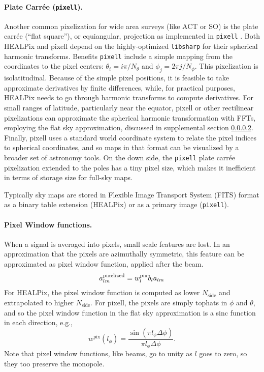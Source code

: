 \paragraph{Plate Carr\'ee (\texttt{pixell}).}
Another common pixelization for wide area surveys (like ACT or SO) is the plate carr\'ee (``flat square''), or equiangular, projection as implemented in \texttt{pixell} \citep{2021ascl.soft02003N}.  Both HEALPix and pixell depend on the highly-optimized \texttt{libsharp} \citep{2013A&A...554A.112R} for their spherical harmonic transforms.  Benefits \texttt{pixell} include a simple mapping from the coordinates to the pixel centers: $\theta_i = i\pi/N_\theta$ and $\phi_j = 2\pi j/N_\phi$.  This pixelization is isolatitudinal.  Because of the simple pixel positions, it is feasible to take approximate derivatives by finite differences, while, for practical purposes, HEALPix needs to go through harmonic transforms to compute derivatives.  For small ranges of latitude, particularly near the equator, pixell or other rectilinear pixelizations can approximate the spherical harmonic transformation with FFTs, employing the flat sky approximation, discussed in supplemental section \ref{}.  Finally, pixell uses a standard world coordinate system to relate the pixel indices to spherical coordinates, and so maps in that format can be visualized by a broader set of astronomy tools.  On the down side, the \texttt{pixell} plate carr\'ee pixelization extended to the poles has a tiny pixel size, which makes it inefficient in terms of storage size for full-sky maps.

Typically sky maps are stored in Flexible Image Transport System (FITS) format as a binary table extension (HEALPix) or as a primary image (\texttt{pixell}).

\paragraph{Pixel Window functions.}
When a signal is averaged into pixels, small scale features are lost. In an approximation that the pixels are azimuthally symmetric, this feature can be approximated as pixel window function, applied after the beam.  
\begin{equation}
  a^{\rm pixelized}_{lm} = w^{\rm pix}_l b_l a_{lm} 
\end{equation}
For HEALPix, the pixel window function is computed as lower $N_\textrm{side}$ and extrapolated to higher $N_\textrm{side}$.  For pixell, the pixels are simply tophats in $\phi$ and $\theta$, and so the pixel window function in the flat sky approximation is a sinc function in each direction, e.g.,
\begin{equation}
w^\textrm{pix}(l_\phi) = \frac{\sin(\pi l_\phi \Delta \phi)}{\pi l_\phi \Delta\phi}.
\end{equation}
Note that pixel window functions, like beams, go to unity as $l$ goes to zero, so they too preserve the monopole.

